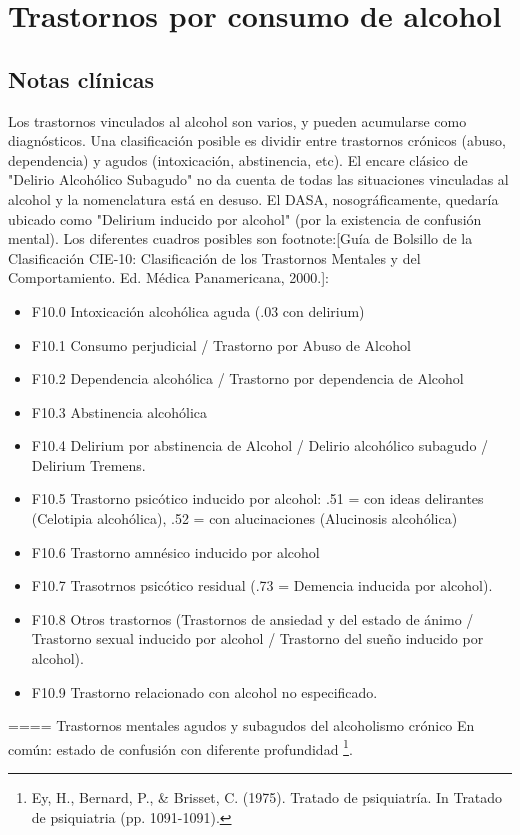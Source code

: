 \documentclass[encares.tex]{subfiles}
\begin{document}
\section*{Trastornos por consumo de alcohol}
\subsection*{Notas clínicas}
Los trastornos vinculados al alcohol son varios, y pueden acumularse como diagnósticos. Una clasificación posible es dividir entre trastornos crónicos (abuso, dependencia) y agudos (intoxicación, abstinencia, etc). El encare clásico de "Delirio Alcohólico Subagudo" no da cuenta de todas las situaciones vinculadas al alcohol y la nomenclatura está en desuso. El DASA, nosográficamente, quedaría ubicado como "Delirium inducido por alcohol" (por la existencia de confusión mental). Los diferentes cuadros posibles son footnote:[Guía de Bolsillo de la Clasificación CIE-10: Clasificación de los Trastornos Mentales y del Comportamiento. Ed. Médica Panamericana, 2000.]:
\begin{itemize}
\item F10.0 Intoxicación alcohólica aguda (.03 con delirium)
\item F10.1 Consumo perjudicial / Trastorno por Abuso de Alcohol
\item F10.2 Dependencia alcohólica / Trastorno por dependencia de Alcohol
\item F10.3 Abstinencia alcohólica
\item F10.4 Delirium por abstinencia de Alcohol / Delirio alcohólico subagudo / Delirium Tremens.
\item F10.5 Trastorno psicótico inducido por alcohol: .51 = con ideas delirantes (Celotipia alcohólica), .52 = con alucinaciones (Alucinosis alcohólica)
\item F10.6 Trastorno amnésico inducido por alcohol
\item F10.7 Trasotrnos psicótico residual (.73 = Demencia inducida por alcohol).
\item F10.8 Otros trastornos (Trastornos de ansiedad y del estado de ánimo / Trastorno sexual inducido por alcohol / Trastorno del sueño inducido por alcohol).
\item F10.9 Trastorno relacionado con alcohol no especificado.
\end{itemize}
==== Trastornos mentales agudos y subagudos del alcoholismo crónico
En común: estado de confusión con diferente profundidad \footnote{Ey, H., Bernard, P., \& Brisset, C. (1975). Tratado de psiquiatría. In Tratado de psiquiatria (pp. 1091-1091).}.
\end{document}
